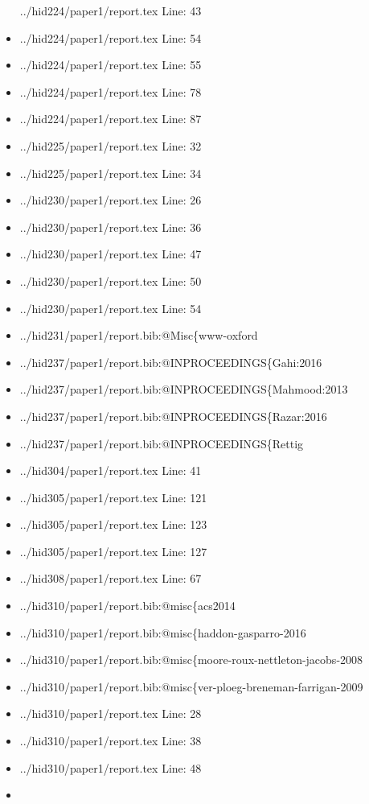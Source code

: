 \begin{itemize}
  ../hid224/paper1/report.tex Line: 43
\item
  ../hid224/paper1/report.tex Line: 54
\item
  ../hid224/paper1/report.tex Line: 55
\item
  ../hid224/paper1/report.tex Line: 78
\item
  ../hid224/paper1/report.tex Line: 87
\item
  ../hid225/paper1/report.tex Line: 32
\item
  ../hid225/paper1/report.tex Line: 34
\item
  ../hid230/paper1/report.tex Line: 26
\item
  ../hid230/paper1/report.tex Line: 36
\item
  ../hid230/paper1/report.tex Line: 47
\item
  ../hid230/paper1/report.tex Line: 50
\item
  ../hid230/paper1/report.tex Line: 54
\item
  ../hid231/paper1/report.bib:@Misc\{www-oxford
\item
  ../hid237/paper1/report.bib:@INPROCEEDINGS\{Gahi:2016
\item
  ../hid237/paper1/report.bib:@INPROCEEDINGS\{Mahmood:2013
\item
  ../hid237/paper1/report.bib:@INPROCEEDINGS\{Razar:2016
\item
  ../hid237/paper1/report.bib:@INPROCEEDINGS\{Rettig
\item
  ../hid304/paper1/report.tex Line: 41
\item
  ../hid305/paper1/report.tex Line: 121
\item
  ../hid305/paper1/report.tex Line: 123
\item
  ../hid305/paper1/report.tex Line: 127
\item
  ../hid308/paper1/report.tex Line: 67
\item
  ../hid310/paper1/report.bib:@misc\{acs2014
\item
  ../hid310/paper1/report.bib:@misc\{haddon-gasparro-2016
\item
  ../hid310/paper1/report.bib:@misc\{moore-roux-nettleton-jacobs-2008
\item
  ../hid310/paper1/report.bib:@misc\{ver-ploeg-breneman-farrigan-2009
\item
  ../hid310/paper1/report.tex Line: 28
\item
  ../hid310/paper1/report.tex Line: 38
\item
  ../hid310/paper1/report.tex Line: 48
\item

\end{itemize}
